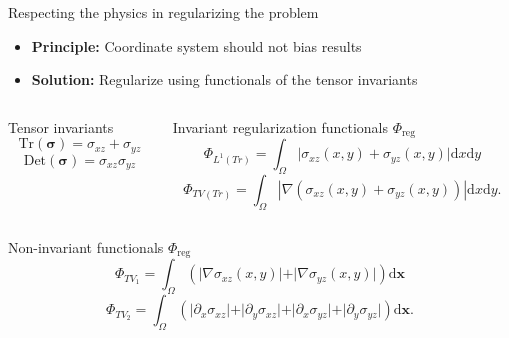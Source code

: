 \documentclass[presentation,aspectratio=169]{beamer}
\newcommand{\dd}{\mathrm{d}}
\newcommand{\bx}{\mathbf{x}}
\begin{document}
 
\begin{frame}{Respecting the physics in regularizing the problem}
\small
\begin{itemize}
\item \textbf{Principle:} Coordinate system should not bias results
\item \textbf{Solution:}  Regularize using functionals of the tensor invariants
\end{itemize}
\begin{columns}
\begin{column}{0.35\textwidth}
\begin{block}{Tensor invariants}
\[
\textrm{Tr}(\boldsymbol\sigma) = \sigma_{xz} + \sigma_{yz}
\]
\[
\textrm{Det}(\boldsymbol\sigma) = \sigma_{xz}\sigma_{yz}
\]
\end{block}
\end{column}
\begin{column}{0.6\textwidth}
\begin{exampleblock}{Invariant regularization functionals $\Phi_{\textrm{reg}}$}
\[
\Phi_{L^1(Tr)} = \int_\Omega \vert \sigma_{xz}(x,y) + \sigma_{yz}(x,y)  \vert \dd x\dd y
\]
\[
\Phi_{TV(Tr)} =  \int_\Omega | \nabla(\sigma_{xz}(x,y) + \sigma_{yz}(x,y) ) | \dd x\dd y.
\]

\end{exampleblock}
\end{column}
\end{columns}
\begin{block}{Non-invariant functionals $\Phi_{\textrm{reg}}$}
\[
 \Phi_{TV_1} = \int_\Omega \left( \vert\nabla\sigma_{xz}(x,y) \vert + \vert\nabla\sigma_{yz}(x,y) \vert\right)\dd\bx
\]
\[
\Phi_{TV_2} = \int_\Omega  \left( \vert\partial_x\sigma_{xz}\vert + \vert\partial_y\sigma_{xz}\vert + \vert\partial_x\sigma_{yz}\vert+ \vert\partial_y\sigma_{yz}\vert\right)\dd\bx.
\]

\end{block}

\end{frame}
\end{document}
